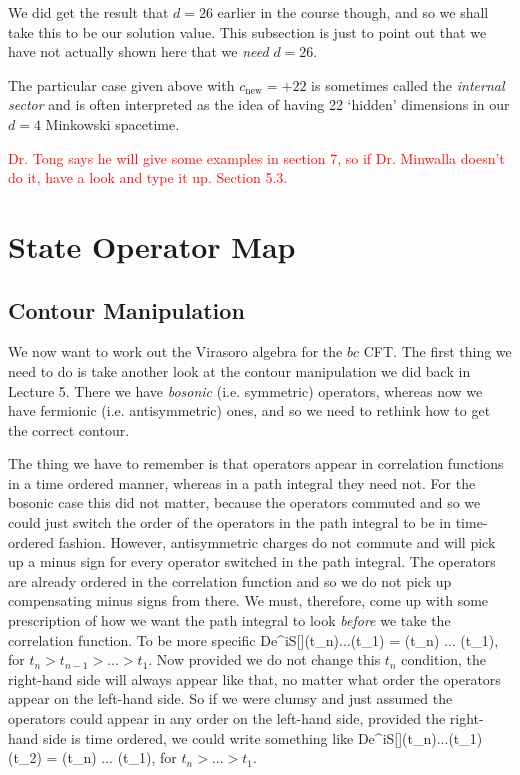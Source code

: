 We did get the result that $d=26$ earlier in the course though, and so we shall take this to be our solution value. This subsection is just to point out that we have not actually shown here that we \textit{need} $d=26$. 

The particular case given above with $c_{\text{new}}=+22$ is sometimes called the \textit{internal sector} and is often interpreted as the idea of having 22 `hidden' dimensions in our $d=4$ Minkowski spacetime. 

\br 
    \textcolor{red}{Dr. Tong says he will give some examples in section 7, so if Dr. Minwalla doesn't do it, have a look and type it up. Section 5.3.}
\er 

\section{State Operator Map}

\subsection{Contour Manipulation}

We now want to work out the Virasoro algebra for the $bc$ CFT. The first thing we need to do is take another look at the contour manipulation we did back in Lecture 5. There we have \textit{bosonic} (i.e. symmetric) operators, whereas now we have fermionic (i.e. antisymmetric) ones, and so we need to rethink how to get the correct contour. 

The thing we have to remember is that operators appear in correlation functions in a time ordered manner, whereas in a path integral they need not. For the bosonic case this did not matter, because the operators commuted and so we could just switch the order of the operators in the path integral to be in time-ordered fashion. However, antisymmetric charges do not commute and will pick up a minus sign for every operator switched in the path integral. The operators are already ordered in the correlation function and so we do not pick up compensating minus signs from there. We must, therefore, come up with some prescription of how we want the path integral to look \textit{before} we take the correlation function. To be more specific
\bse 
    \int D\phi e^{iS[\phi]}\cO(t_n)...\cO(t_1) = \la \cO(t_n) ... \cO(t_1)\ra,
\ese 
for $t_n>t_{n-1}>...>t_1$. Now provided we do not change this $t_n$ condition, the right-hand side will always appear like that, no matter what order the operators appear on the left-hand side. So if we were clumsy and just assumed the operators could appear in any order on the left-hand side, provided the right-hand side is time ordered, we could write something like 
\bse 
    \int D\phi e^{iS[\phi]}\cO(t_n)...\cO(t_1)\cO(t_2) = \la \cO(t_n) ... \cO(t_1)\ra,
\ese
for $t_n>...>t_1$.

